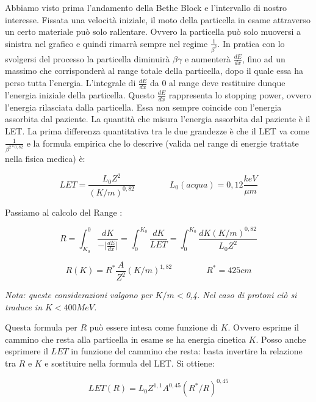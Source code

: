 \documentclass [a4paper, twoside] {book}
\begin{document}
Abbiamo visto prima l'andamento della Bethe Block e l'intervallo di nostro interesse. Fissata una velocità iniziale, il moto della particella in esame attraverso un certo materiale può solo rallentare. Ovvero la particella può solo muoversi a sinistra nel grafico e quindi rimarrà sempre nel regime $\frac{1}{\beta^2}$. In pratica con lo svolgersi del processo la particella diminuirà $\beta\gamma$ e aumenterà $\frac{dE}{dx}$, fino ad un massimo che corrisponderà al range totale della particella, dopo il quale essa ha perso tutta l'energia. L'integrale di $\frac{dE}{dx}$ da 0 al range deve restituire dunque l'energia iniziale della particella. 
Questo $\frac{dE}{dx}$ rappresenta lo stopping power, ovvero l'energia rilasciata dalla particella. Essa non sempre coincide con l'energia assorbita dal paziente. La quantità che misura l'energia assorbita dal paziente è il LET. La prima differenza quantitativa tra le due grandezze è che il LET va come $\frac{1}{\beta^{2*0,82}}$ e la formula empirica che lo descrive (valida nel range di energie trattate nella fisica medica) è:

\begin{equation}
LET=\frac{L_0Z^2}{(K/m)^{0,82}} \qquad \qquad L_0(acqua)=0,12 \frac{keV}{\mu m}
\end{equation}

Passiamo al calcolo del Range \cite{Amaldi}:

\begin{equation}
R=\int_{K_0}^0 \frac{dK}{-|{\frac{dE}{dx}|}} =\int_0^{K_0} \frac{dK}{LET} = \int_0^{K_0} \frac{dK (K/m)^{0,82}}{L_0Z^2}  
\end{equation}

\begin{equation}
R(K)=R^*\frac{A}{Z^2}(K/m)^{1,82} \qquad \qquad R^* = 425 cm
\end{equation}

\emph{Nota: queste considerazioni valgono per $K/m<$0,4. Nel caso di protoni ciò si traduce in $K<400 MeV$.}

Questa formula per $R$ può essere intesa come funzione di $K$. Ovvero esprime il cammino che resta alla particella in esame se ha energia cinetica $K$. Posso anche esprimere il $LET$ in funzione del cammino che resta: basta invertire la relazione tra $R$ e $K$ e sostituire nella formula del LET. Si ottiene:

\begin{equation}
LET(R)=L_0Z^{1,1}A^{0,45}(R^*/R)^{0,45}
\end{equation}
\end{document}
